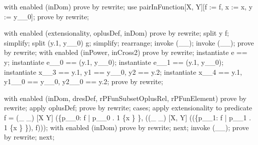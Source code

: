\begin{LPScript}\begin{zproof}[rPFunElement]
    with enabled (inDom) prove by rewrite;
    use pairInFunction[X, Y][f := f, x := x, y := y\_\_0];
    prove by rewrite;
\end{zproof}\end{LPScript}

\begin{LPScript}\begin{zproof}[rPFunSubsetOplusRel]
    with enabled (extensionality, oplusDef, inDom) prove by rewrite;
    split y \in f;
    simplify;
    split \lnot  (y.1, y\_\_0) \in  g;
    simplify;
    rearrange;
    invoke (\_\pfun \_);
    invoke (\_\rel \_);
    prove by rewrite;
    with enabled (inPower, inCross2) prove by rewrite;
    instantiate e == y;
    instantiate e\_\_0 == (y.1, y\_\_0);
    instantiate e\_\_1 == (y.1, y\_\_0);
    instantiate x\_\_3 == y.1, y1 == y\_\_0, y2 == y.2;
    instantiate x\_\_4 == y.1, y1\_\_0 == y\_\_0, y2\_\_0 == y.2;
    prove by rewrite;
\end{zproof}\end{LPScript}

\begin{LPScript}\begin{zproof}[lPFunSubsetOplusUnitRel]
    with enabled (inDom, dresDef, rPFunSubsetOplusRel, rPFunElement)
        prove by rewrite;
    apply oplusDef;
    prove by rewrite;
    cases;
	  apply extensionality to predicate f = (\_ \cup \_) [X \cross Y] 
	  		(\{p\_\_0: f | p\_\_0 . 1 \in \{x \} \}, 
	  			((\_ \ndres \_) [X, Y] ((\dom [X, Y] \{p\_\_1: f | p\_\_1 . 1 \in \{x \} \}), f)));
      with enabled (inDom) prove by rewrite;
    next;
      invoke (\_\rel \_);
      prove by rewrite;
    next;
\end{zproof}\end{LPScript}

